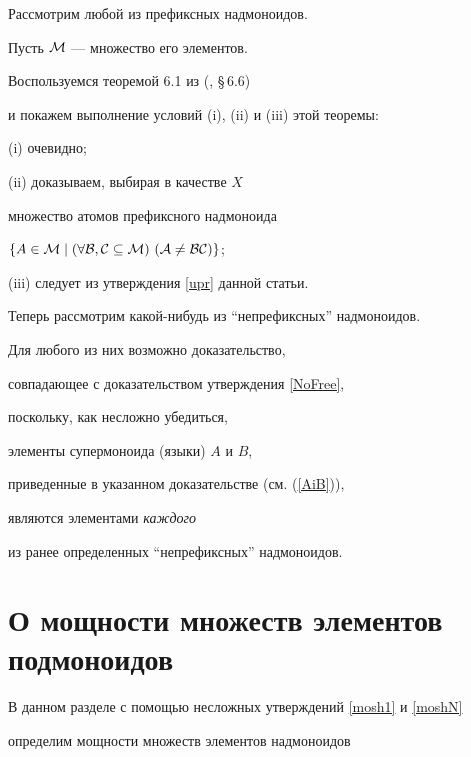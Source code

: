 \begin{pf}


 Рассмотрим любой из префиксных надмоноидов.


 Пусть $\cal{M}$ --- множество его элементов.


 Воспользуемся теоремой 6.1 из (\cite{cohn}, \S\,6.6)


 и покажем выполнение условий (i), (ii) и (iii) этой теоремы:


(i) очевидно;


(ii) доказываем, выбирая в качестве $X$


множество атомов префиксного надмоноида


$\{A\in\CM\mid


(\forall B,C\seq\CM)\ (A\ne BC)\}$;


(iii) следует из утверждения \ref{upr} данной статьи.








 Теперь рассмотрим какой-нибудь из ``непрефиксных'' надмоноидов.


 Для любого из них возможно доказательство,


 совпадающее с доказательством утверждения \ref{NoFree},


 поскольку, как несложно убедиться,


 элементы супермоноида (языки) $A$ и $B$,


 приведенные в указанном доказательстве (см. (\ref{AiB})),


 являются элементами {\it каждого\/}


 из ранее определенных ``непрефиксных'' надмоноидов.


\end{pf}











 \section{О мощности множеств элементов подмоноидов}


 \label{mosh}





 В данном разделе с помощью несложных утверждений \ref{mosh1} и \ref{moshN}


определим мощности множеств элементов надмоноидов


